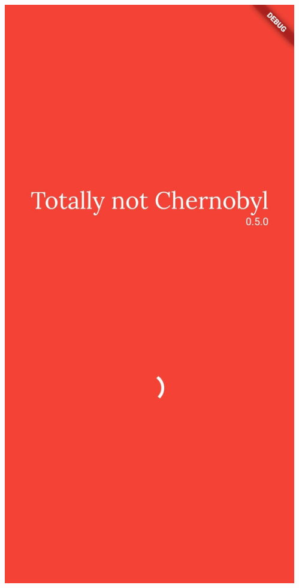 \documentclass[czech,aspectratio=169]{beamer}
\begin{document}
  \begin{frame}
    \begin{columns}
      \begin{column}{.25\textwidth}
        \begin{center}
          \includegraphics[width=.9\textwidth]{slides/screen-0}
        \end{center}
      \end{column}
      \begin{column}{.25\textwidth}

\end{column}
\end{columns}
\end{frame}
\end{document}
